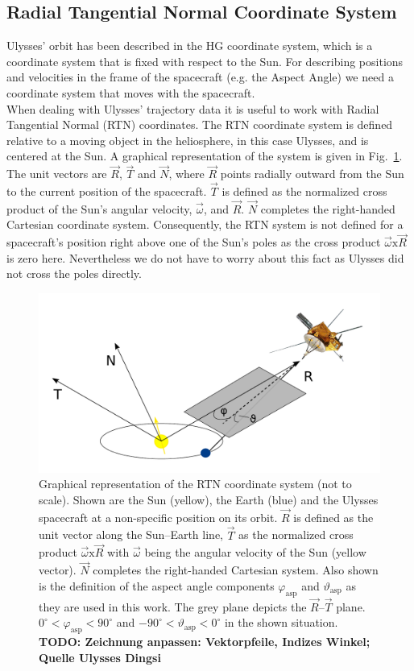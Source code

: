 \subsection{Radial Tangential Normal Coordinate System}
Ulysses' orbit has been described in the HG coordinate system, which is a coordinate system that is fixed with respect to the Sun. For describing positions and velocities in the frame of the spacecraft (e.g. the Aspect Angle) we need a coordinate system that moves with the spacecraft.
\\
When dealing with Ulysses' trajectory data it is useful to work with Radial Tangential Normal (RTN) coordinates. The RTN coordinate system is defined relative to a moving object in the heliosphere, in this case Ulysses, and is centered at the Sun. A graphical representation of the system is given in Fig.~\ref{fig:rtn}. The unit vectors are $\vec{R}$, $\vec{T}$ and $\vec{N}$, where $\vec{R}$ points radially outward from the Sun to the current position of the spacecraft. $\vec{T}$ is defined as the normalized cross product of the Sun's angular velocity, $\vec{\omega}$, and $\vec{R}$. $\vec{N}$ completes the right-handed Cartesian coordinate system. Consequently, the RTN system is not defined for a spacecraft's position right above one of the Sun's poles as the cross product $\vec{\omega} \mathrm{x} \vec{R}$ is zero here. Nevertheless we do not have to worry about this fact as Ulysses did not cross the poles directly.
%
%
\begin{figure}[h]
	\includegraphics[width=1\textwidth]{Figures/RTN_AA_angles.pdf}
	\centering
	\caption{Graphical representation of the RTN coordinate system (not to scale). Shown are the Sun (yellow), the Earth (blue) and the Ulysses spacecraft at a non-specific position on its orbit. $\vec{R}$ is defined as the unit vector along the Sun--Earth line, $\vec{T}$ as the normalized cross product $\vec{\omega} \mathrm{x} \vec{R}$ with $\vec{\omega}$ being the angular velocity of the Sun (yellow vector). $\vec{N}$ completes the right-handed Cartesian system. Also shown is the definition of the aspect angle components $\varphi_{\mathrm{asp}}$ and $\vartheta_{\mathrm{asp}}$ as they are used in this work. The grey plane depicts the $\vec{R}$--$\vec{T}$ plane. $0 ^\circ < \varphi_{\mathrm{asp}} < 90^\circ$ and $-90 ^\circ < \vartheta_{\mathrm{asp}} < 0^\circ$ in the shown situation. \textbf{TODO: Zeichnung anpassen: Vektorpfeile, Indizes Winkel; Quelle Ulysses Dingsi}}
	\label{fig:rtn}
\end{figure}
%
%
%
